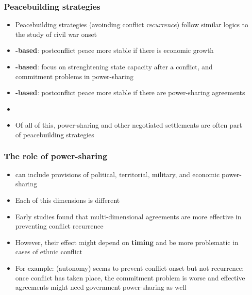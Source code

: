 \documentclass[aspectratio=43]{beamer}
\begin{document}
\begin{frame}
\frametitle{Peacebuilding strategies}
\centering

\begin{itemize}
  \item Peacebuilding strategies (avoinding conflict \textit{recurrence}) follow similar logics to the study of civil war onset
  \item<2->[1.] \textbf{{\color{red}{Greed}}-based}: postconflict peace more stable if there is economic growth
  \item<3->[2.] \textbf{{\color{red}{Opportunity}}-based}: focus on strenghtening state capacity after a conflict, and commitment problems in power-sharing
  \item<4->[3.] \textbf{{\color{red}{Grievance}}-based}: postconflict peace more stable if there are power-sharing agreements
  \item<4->[]
  \item<4-> Of all of this, power-sharing and other negotiated settlements are often part of peacebuilding strategies
\end{itemize}

\end{frame}

\begin{frame}
\frametitle{The role of power-sharing}
\centering

\begin{itemize}
  \item {} can include provisions of political, territorial, military, and economic power-sharing
  \item<2-> Each of this dimensions is different
  \item<2-> Early studies found that multi-dimensional agreements are more effective in preventing conflict recurrence
  \item<3-> However, their effect might depend on \textbf{timing} and be more problematic in cases of ethnic conflict
  \item<4-> For example:  (autonomy) seems to prevent conflict onset but not recurrence: once conflict has taken place, the commitment problem is worse and effective agreements might need government power-sharing as well
\end{itemize}

\end{frame}
\end{document}
